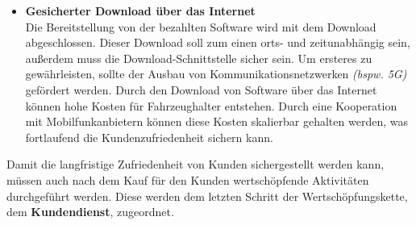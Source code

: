 \begin{itemize}
	\item[] \hspace{-0.6cm} \textbf{Gesicherter Download über das Internet}\\
	Die Bereitstellung von der bezahlten Software wird mit dem Download abgeschlossen. Dieser Download soll zum einen orts- und zeitunabhängig sein, außerdem muss die Download-Schnittstelle sicher sein. Um ersteres zu gewährleisten, sollte der Ausbau von Kommunikationsnetzwerken \textit{(bspw. 5G)} gefördert werden. Durch den Download von Software über das Internet können hohe Kosten für Fahrzeughalter entstehen. Durch eine Kooperation mit Mobilfunkanbietern können diese Kosten skalierbar gehalten werden, was fortlaufend die Kundenzufriedenheit sichern kann.
\end{itemize}
Damit die langfristige Zufriedenheit von Kunden sichergestellt werden kann, müssen auch nach dem Kauf für den Kunden wertschöpfende Aktivitäten durchgeführt werden. Diese werden dem letzten Schritt der Wertschöpfungskette, dem \textbf{Kundendienst}, zugeordnet.	
